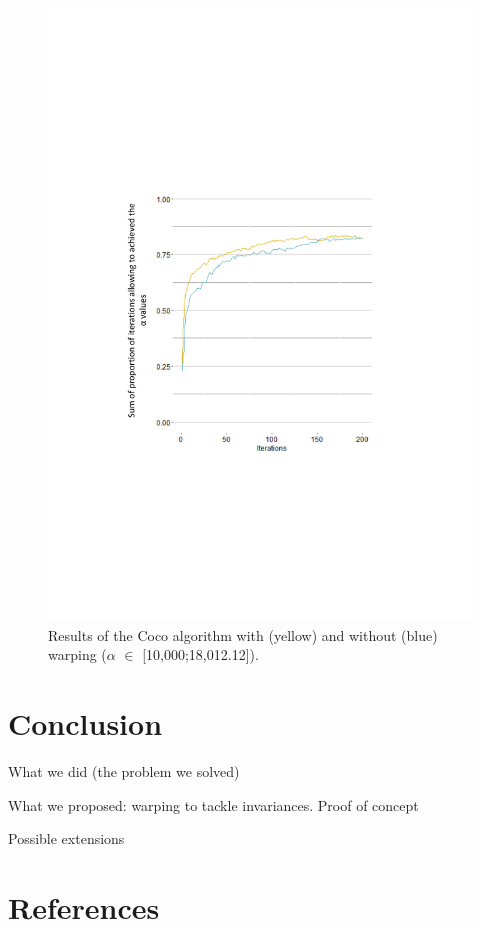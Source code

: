 \begin{figure}[!ht]
	\centering
	\includegraphics[trim = 2cm 7cm 4cm 8cm, clip]{Figures_Warping_resultats_courbes_algoCoco_10000_18000.pdf}
	\caption{Results of the Coco algorithm with (yellow) and without (blue) warping ($\alpha$ $\in$ [10,000;18,012.12]).}\label{fig:algococo10000}
\end{figure}

\section{Conclusion}

What we did (the problem we solved)

What we proposed: warping to tackle invariances. Proof of concept

Possible extensions

\section*{References}


